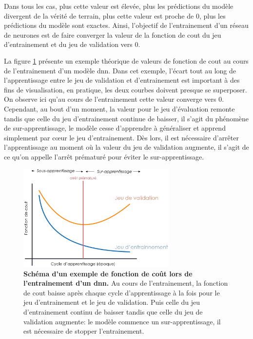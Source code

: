 Dans tous les cas, plus cette valeur est élevée, plus les prédictions du modèle divergent de la vérité de terrain, plus cette valeur est proche de 0, plus les prédictions du modèle sont exactes. Ainsi, l'objectif de l'entrainement d'un réseau de neurones est de faire converger la valeur de la fonction de cout du jeu d'entrainement et du jeu de validation vers 0. 


La figure \ref{fig:loss_func} présente un exemple théorique de valeurs de fonction de cout au cours de l'entrainement d'un modèle \gls{dnn}. Dans cet exemple, l'écart tout au long de l'apprentissage entre le jeu de validation et d'entrainement est important à des fins de visualisation, en pratique, les deux courbes doivent presque se superposer. On observe ici qu'au cours de l'entrainement cette valeur converge vers 0. Cependant, au bout d'un moment, la valeur pour le jeu d'évaluation remonte tandis que celle du jeu d'entrainement continue de baisser, il s'agit du phénomène de sur-apprentissage, le modèle cesse d'apprendre à généraliser et apprend simplement par cœur le jeu d'entrainement. Dès lors, il est nécessaire d'arrêter l'apprentissage au moment où la valeur du jeu de validation augmente, il s'agit de ce qu'on appelle l'arrêt prématuré pour éviter le sur-apprentissage.
\begin{figure}[!ht]
 \centering
 \includegraphics[width=0.7\textwidth]{figures/loss_function.png}
 \caption[Schéma d'un exemple de fonction de coût lors d'un entraînement]{\textbf{Schéma d'un exemple de fonction de coût lors de l'entrainement d'un \gls{dnn}.} Au cours de l'entrainement, la fonction de cout baisse après chaque cycle d'apprentissage à la fois pour le jeu d'entrainement et le jeu de validation. Puis celle du jeu d'entrainement continu de baisser tandis que celle du jeu de validation augmente: le modèle commence un sur-apprentissage, il est nécessaire de stopper l'entrainement.}
 \label{fig:loss_func}
\end{figure}
